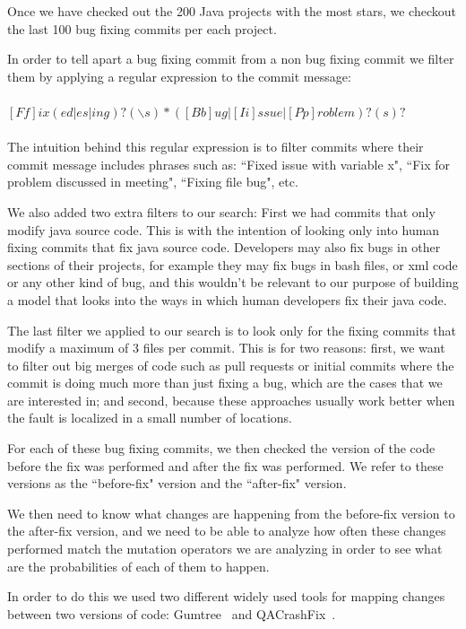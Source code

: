\documentclass[conference]{IEEEtran}
\begin{document}
Once we have checked out the 200 Java projects with the most stars, we checkout 
the last 100 bug fixing commits per each project. 

In order to tell apart a bug fixing commit from a non bug fixing commit we 
filter them by applying a regular expression to the commit message:
\\
\\
$[Ff]ix(ed|es|ing)?(\backslash s)*([Bb]ug|[Ii]ssue|[Pp]roblem)?(s)?$
\\
\\
The intuition behind this regular expression is to filter commits where their 
commit message includes phrases such as: ``Fixed issue with variable x", ``Fix for 
problem discussed in meeting", ``Fixing file bug", etc.

We also added two extra filters to our search: First we had commits that only 
modify java source code. This is with the intention of looking only into human 
fixing commits that fix java source code. Developers may also fix bugs in other 
sections of their projects, for example they may fix bugs in bash files, or xml 
code or any other kind of bug, and this wouldn't be relevant to our purpose of 
building a model that looks into the ways in which human developers fix their 
java code.

The last filter we applied to our search is to look only for the fixing commits 
that modify a maximum of 3 files per commit. This is for two reasons: first, we 
want to filter out big merges of code such as pull requests or initial commits 
where the commit is doing much more than just fixing a bug, which are the cases 
that we are interested in; and second, because these approaches usually work 
better when the fault is localized in a small number of locations.

For each of these bug fixing commits, we then checked the version of the code 
before the fix was performed and after the fix was performed. We refer to these 
versions as the ``before-fix" version and the ``after-fix" version.

We then need to know what changes are happening from the before-fix version to 
the after-fix version, and we need to be able to analyze how often these changes 
performed match the mutation operators we are analyzing in order to see what are 
the probabilities of each of them to happen.

In order to do this we used two different widely used tools for mapping changes 
between two versions of code: Gumtree~\cite{falleri14} and QACrashFix~\cite{gao15}.
\end{document}

